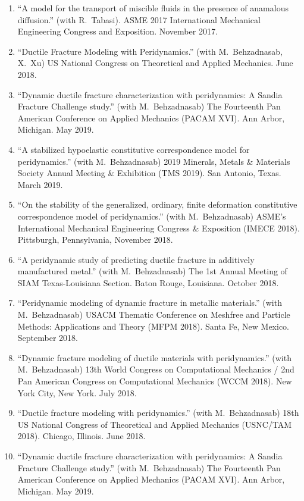 \begin{enumerate}
  \item ``A model for the transport of miscible fluids in the presence of anamalous diffusion.'' (with R.\ Tabasi).  ASME 2017 International Mechanical Engineering Congress and Exposition. November 2017.
  \item ``Ductile Fracture Modeling with Peridynamics.'' (with M.\ Behzadnasab, X.\ Xu) US National Congress on Theoretical and Applied Mechanics. June 2018.
  \item ``Dynamic ductile fracture characterization with peridynamics: A Sandia Fracture Challenge study.'' (with M.\ Behzadnasab) The Fourteenth Pan American Conference on Applied Mechanics (PACAM XVI). Ann Arbor, Michigan. May 2019.
  \item ``A stabilized hypoelastic constitutive correspondence model for peridynamics.'' (with M.\ Behzadnasab) 2019 Minerals, Metals \& Materials Society Annual Meeting \& Exhibition (TMS 2019). San Antonio, Texas. March 2019.
  \item ``On the stability of the generalized, ordinary, finite deformation constitutive correspondence model of peridynamics.'' (with M.\ Behzadnasab) ASME's International Mechanical Engineering Congress \& Exposition (IMECE 2018). Pittsburgh, Pennsylvania, November 2018.
  \item ``A peridynamic study of predicting ductile fracture in additively manufactured metal.'' (with M.\ Behzadnasab) The 1st Annual Meeting of SIAM Texas-Louisiana Section. Baton Rouge, Louisiana. October 2018. 
  \item ``Peridynamic modeling of dynamic fracture in metallic materials.'' (with M.\ Behzadnasab) USACM Thematic Conference on Meshfree and Particle Methods: Applications and Theory (MFPM 2018). Santa Fe, New Mexico. September 2018.
  \item ``Dynamic fracture modeling of ductile materials with peridynamics.'' (with M.\ Behzadnasab) 13th World Congress on Computational Mechanics / 2nd Pan American Congress on Computational Mechanics (WCCM 2018). New York City, New York. July 2018.
  \item ``Ductile fracture modeling with peridynamics.'' (with M.\ Behzadnasab) 18th US National Congress of Theoretical and Applied Mechanics (USNC/TAM 2018). Chicago, Illinois. June 2018. 
  \item ``Dynamic ductile fracture characterization with peridynamics: A Sandia Fracture Challenge study.'' (with M.\ Behzadnasab) The Fourteenth Pan American Conference on Applied Mechanics (PACAM XVI). Ann Arbor, Michigan. May 2019.

\end{enumerate}
